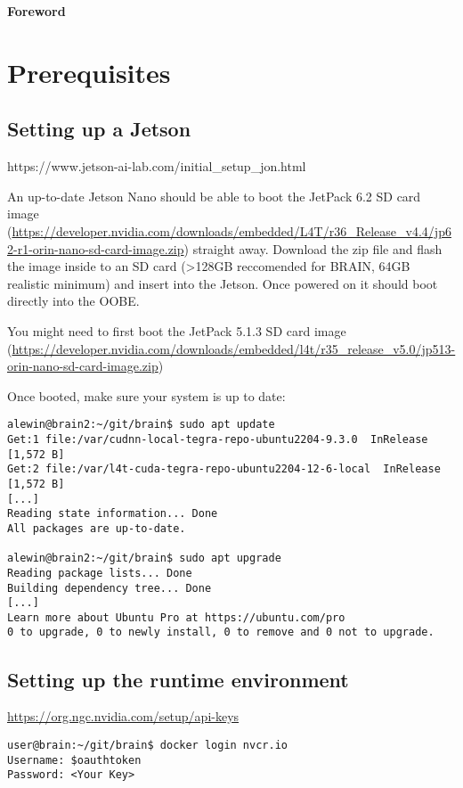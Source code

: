 \documentclass{article}
\begin{document}
\frontmatter
\tableofcontents
\clearpage

{\huge {\bf Foreword}}

\section{Prerequisites}

\subsection{Setting up a Jetson}

https://www.jetson-ai-lab.com/initial_setup_jon.html

An up-to-date Jetson Nano should be able to boot the JetPack 6.2 SD card image (\href{https://developer.nvidia.com/downloads/embedded/L4T/r36_Release_v4.4/jp62-r1-orin-nano-sd-card-image.zip}{https://developer.nvidia.com/downloads/embedded/L4T/r36_Release_v4.4/jp62-r1-orin-nano-sd-card-image.zip}) straight away. Download the zip file and flash the image inside to an SD card (>128GB reccomended for BRAIN, 64GB realistic minimum) and insert into the Jetson. Once powered on it should boot directly into the OOBE.

You might need to first boot the JetPack 5.1.3 SD card image (\href{https://developer.nvidia.com/downloads/embedded/l4t/r35_release_v5.0/jp513-orin-nano-sd-card-image.zip}{https://developer.nvidia.com/downloads/embedded/l4t/r35_release_v5.0/jp513-orin-nano-sd-card-image.zip})

Once booted, make sure your system is up to date:

\begin{lstlisting}
alewin@brain2:~/git/brain$ sudo apt update
Get:1 file:/var/cudnn-local-tegra-repo-ubuntu2204-9.3.0  InRelease [1,572 B]
Get:2 file:/var/l4t-cuda-tegra-repo-ubuntu2204-12-6-local  InRelease [1,572 B]
[...]
Reading state information... Done
All packages are up-to-date.

alewin@brain2:~/git/brain$ sudo apt upgrade
Reading package lists... Done
Building dependency tree... Done
[...]
Learn more about Ubuntu Pro at https://ubuntu.com/pro
0 to upgrade, 0 to newly install, 0 to remove and 0 not to upgrade.
\end{lstlisting}

\subsection{Setting up the runtime environment}

\href{https://org.ngc.nvidia.com/setup/api-keys}{https://org.ngc.nvidia.com/setup/api-keys}

\begin{lstlisting}
user@brain:~/git/brain$ docker login nvcr.io
Username: $oauthtoken
Password: <Your Key>
\end{lstlisting}
\end{document}
